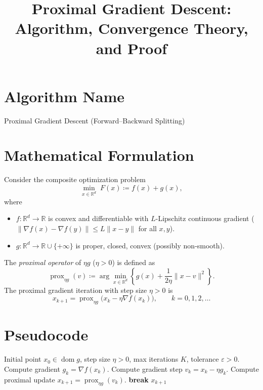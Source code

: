 \documentclass{article}
\title{Proximal Gradient Descent: Algorithm, Convergence Theory, and Proof}
\author{}
\date{}
\begin{document}
\maketitle

\section*{Algorithm Name}
Proximal Gradient Descent (Forward–Backward Splitting)

\section*{Mathematical Formulation}
Consider the composite optimization problem
\[
\min_{x \in \mathbb{R}^d} \; F(x) \coloneqq f(x) + g(x),
\]
where
\begin{itemize}
    \item $f: \mathbb{R}^d \to \mathbb{R}$ is convex and differentiable with $L$-Lipschitz continuous gradient ($\|\nabla f(x) - \nabla f(y)\| \le L \|x-y\|$ for all $x,y$).
    \item $g: \mathbb{R}^d \to \mathbb{R} \cup \{+\infty\}$ is proper, closed, convex (possibly non‑smooth).
\end{itemize}
The \emph{proximal operator} of $\eta g$ ($\eta > 0$) is defined as
\[
\operatorname{prox}_{\eta g}(v) \coloneqq \arg\min_{x \in \mathbb{R}^d} \left\{ g(x) + \frac{1}{2\eta}\|x - v\|^2 \right\}.
\]
The proximal gradient iteration with step size $\eta > 0$ is
\[
x_{k+1} = \operatorname{prox}_{\eta g}\bigl( x_k - \eta \nabla f(x_k) \bigr), \qquad k = 0,1,2,\dots
\]

\section*{Pseudocode}
\begin{algorithm}[H]
\caption{Proximal Gradient Descent}
\begin{algorithmic}[1]
\REQUIRE Initial point $x_0 \in \operatorname{dom} g$, step size $\eta > 0$, max iterations $K$, tolerance $\varepsilon > 0$.
    \STATE Compute gradient $g_k = \nabla f(x_k)$.
    \STATE Compute gradient step $v_k = x_k - \eta g_k$.
    \STATE Compute proximal update $x_{k+1} = \operatorname{prox}_{\eta g}(v_k)$.
     \textbf{break} \ENDIF
\ENDFOR
\RETURN $x_{k+1}$
\end{algorithmic}
\end{algorithm}
\end{document}
